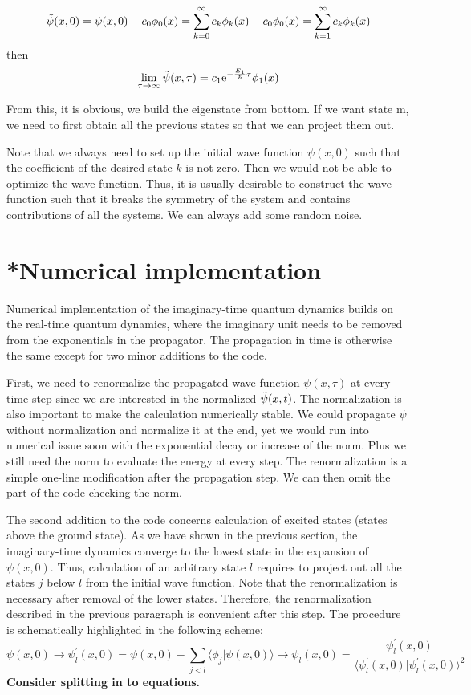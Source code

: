 \begin{equation}
    \Tilde{\psi}(x,0) = \psi(x,0) - c_0 \phi_0(x) = \sum_{k=0}^\infty c_k \phi_k(x) - c_0 \phi_0(x) = \sum_{k=1}^\infty c_k \phi_k(x)
\end{equation}
then
\begin{equation}
    \lim_{\tau\to\infty} \Tilde{\psi}(x,\tau) = c_1  \mathrm{e}^{-\frac{E_1}{\hbar}\tau} \phi_1(x)
\end{equation}

From this, it is obvious, we build the eigenstate from bottom. If we want state m, we need to first obtain all the previous states so that we can project them out. 

Note that we always need to set up the initial wave function $\psi(x,0)$ such that the coefficient of the desired state $k$ is not zero. Then we would not be able to optimize the wave function. Thus, it is usually desirable to construct the wave function such that it breaks the symmetry of the system and contains contributions of all the systems. We can always add some random noise.

\section{*Numerical implementation}

Numerical implementation of the imaginary-time quantum dynamics builds on the real-time quantum dynamics, where the imaginary unit needs to be removed from the exponentials in the propagator. The propagation in time is otherwise the same except for two minor additions to the code.

First, we need to renormalize the propagated wave function $\psi(x,\tau)$ at every time step since we are interested in the normalized $\Tilde{\psi}(x,t)$. The normalization is also important to make the calculation numerically stable. We could propagate $\psi$ without normalization and normalize it at the end, yet we would run into numerical issue soon with the exponential decay or increase of the norm. Plus we still need the norm to evaluate the energy at every step. The renormalization is a simple one-line modification after the propagation step. We can then omit the part of the code checking the norm.

The second addition to the code concerns calculation of excited states (states above the ground state). As we have shown in the previous section, the imaginary-time dynamics converge to the lowest state in the expansion of $\psi(x,0)$. Thus, calculation of an arbitrary state $l$ requires to project out all the states $j$ below $l$ from the initial wave function. Note that the renormalization is necessary after removal of the lower states. Therefore, the renormalization described in the previous paragraph is convenient after this step. The procedure is schematically highlighted in the following scheme:
\begin{equation}
    \psi(x,0) \rightarrow \psi^\prime_l(x,0) = \psi(x,0) - \sum_{j<l}\langle \phi_j | \psi(x,0) \rangle \rightarrow \psi_l(x,0) = \frac{\psi^\prime_l(x,0)}{\langle \psi^\prime_l(x,0) | \psi^\prime_l(x,0) \rangle^2} 
\end{equation}
\textbf{Consider splitting in to equations.}

